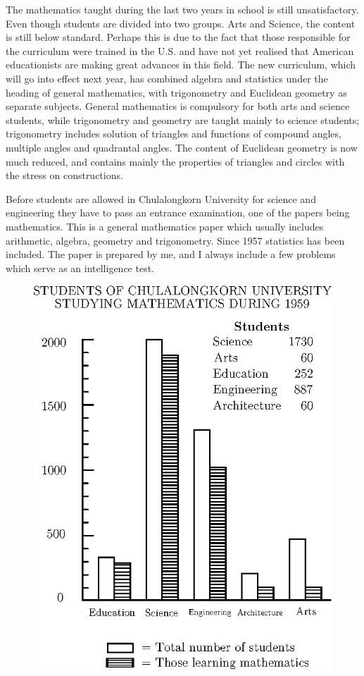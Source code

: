 The mathematics taught during the last two years in school is still unsatisfactory. Even though students are divided into two groups. Arts and Science, the content is still below standard. Perhaps this is due to the fact that those responsible for the curriculum were trained in the U.S. and have not yet realised that American educationists are making great advances in this field. The new curriculum, which will go into effect next year, has combined algebra and statistics under the heading of general mathematics, with trigonometry and Euclidean geometry as separate subjects. General mathematics is compulsory for both arts and science students, while trigonometry and geometry are taught mainly to science students; trigonometry includes solution of triangles and functions of compound angles, multiple angles and quadrantal angles. The content of Euclidean geometry is now much reduced, and contains mainly the properties of triangles and circles with the stress on constructions.

Before students are allowed in Chulalongkorn University for science and engineering they have to pass an entrance examination, one of the papers being mathematics. This is a general mathematics paper which usually includes arithmetic, algebra, geometry and trigonometry. Since 1957 statistics has been included. The paper is prepared by me, and I always include a few problems which serve as an intelligence test.
\begin{figure}[H]
\centering
\includegraphics{figures/fig_03.eps}
\end{figure} 

